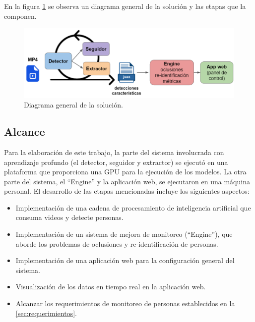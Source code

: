 En la figura \ref{fig:esquemaGeneral} se observa un diagrama general de la solución y las etapas que la componen.

\begin{figure}[ht]
	\centering
	\includegraphics[scale=.6]{./Figures/esquemaGeneral.png}
	\caption{Diagrama general de la solución.}
	\label{fig:esquemaGeneral}
\end{figure}

\newpage

\subsection{Alcance}

Para la elaboración de este trabajo, la parte del sistema involucrada con aprendizaje profundo (el detector, seguidor y extractor) se ejecutó en una plataforma que proporciona una GPU para la ejecución de los modelos. La otra parte del sistema, el ``Engine'' y la aplicación web, se ejecutaron en una máquina personal. El desarrollo de las etapas mencionadas incluye los siguientes aspectos:
\begin{itemize}
\item Implementación de una cadena de procesamiento de inteligencia artificial que consuma videos  y detecte personas.
\item Implementación de un sistema de mejora de monitoreo (``Engine''), que aborde los problemas de oclusiones y re-identificación de personas.
\item Implementación de una aplicación web para la configuración general del sistema.
\item Visualización de los datos en tiempo real en la aplicación web.
\item Alcanzar los requerimientos de monitoreo de personas establecidos en la \ref{sec:requerimientos}.
\end{itemize}


